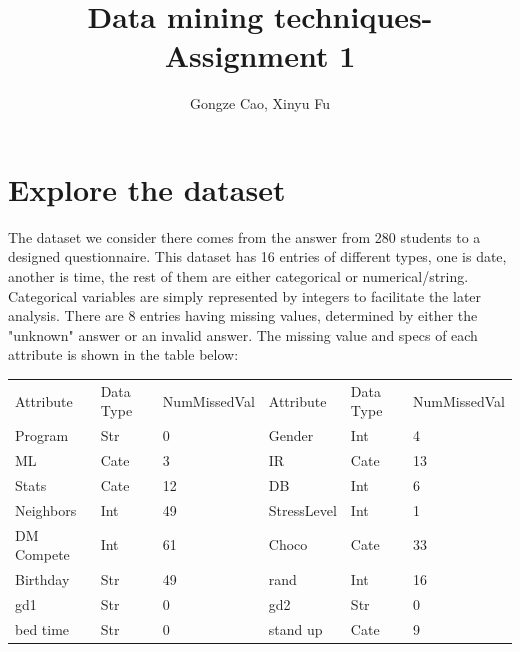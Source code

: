 \documentclass[runningheads]{llncs}
\begin{document}
%
\title{Data mining techniques-Assignment 1}
%
%
\author{Gongze Cao, Xinyu Fu}
%


%
\maketitle              %
%
%
%
%
\section{Explore the dataset}

The dataset we consider there comes from the answer from 280 students to a designed questionnaire. This dataset has 16 entries of different types, one is date, another is time, the rest of them are either categorical or numerical/string. Categorical variables are simply represented by integers to facilitate the later analysis. There are 8 entries having missing values, determined by either the "unknown" answer or an invalid answer. The missing value and specs of each attribute is shown in the table below:

\begin{table}[]
    \begin{tabular}{llllll}
    Attribute  & Data Type & NumMissedVal & Attribute   & Data Type & NumMissedVal \\
    Program    & Str       & 0                    & Gender      & Int       & 4                    \\
    ML         & Cate       & 3                    & IR          & Cate       & 13                   \\
    Stats      & Cate       & 12                   & DB          & Int       & 6                    \\
    Neighbors  & Int       & 49                   & StressLevel & Int       & 1                    \\
    DM Compete & Int       & 61                   & Choco       & Cate       & 33                   \\
    Birthday   & Str       & 49                   & rand        & Int       & 16                   \\
    gd1        & Str       & 0                    & gd2         & Str       & 0                    \\
    bed time   & Str       & 0                    & stand up    & Cate       & 9                   
    \end{tabular}
\end{table}
\end{document}
